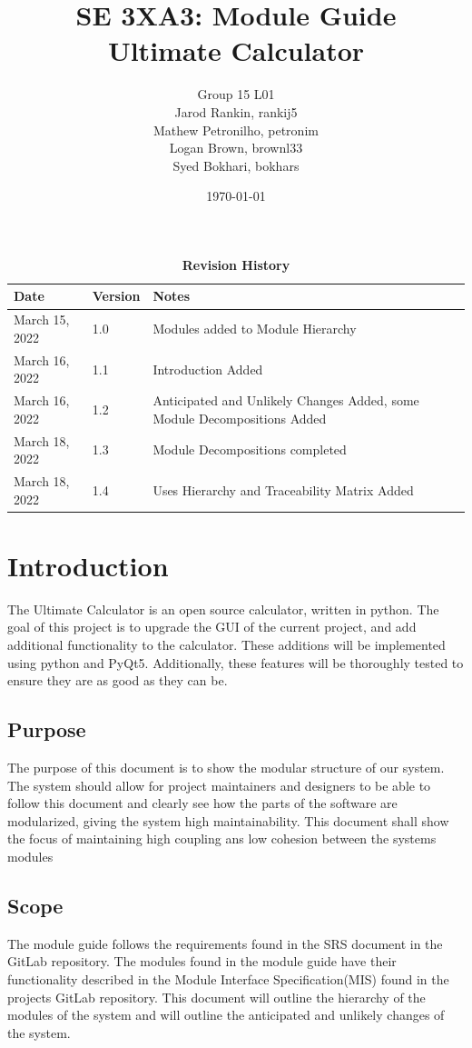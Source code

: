 \documentclass[12pt, titlepage]{article}
\title{SE 3XA3: Module Guide\\Ultimate Calculator}
\author{Group 15 L01
		\\ Jarod Rankin, rankij5
		\\ Mathew Petronilho, petronim
		\\ Logan Brown, brownl33
		\\ Syed Bokhari, bokhars
}
\date{\today}
\begin{document}
\maketitle

\tableofcontents
\listoftables
\listoffigures

\begin{table}[H]
\caption{\bf Revision History}
\begin{tabularx}{\textwidth}{p{3cm}p{2cm}X}
\toprule {\bf Date} & {\bf Version} & {\bf Notes}\\
\midrule
March 15, 2022 & 1.0 & Modules added to Module Hierarchy\\
March 16, 2022 & 1.1 & Introduction Added\\
March 16, 2022 & 1.2 & Anticipated and Unlikely Changes Added, some Module Decompositions Added\\
March 18, 2022 & 1.3 & Module Decompositions completed\\
March 18, 2022 & 1.4 & Uses Hierarchy and Traceability Matrix Added\\
\bottomrule
\end{tabularx}
\end{table}

\newpage


\section{Introduction}
The Ultimate Calculator is an open source calculator, written in python. The goal of this project is to upgrade the GUI of the current project, and add additional functionality to the calculator. These additions will be implemented using python and PyQt5. Additionally, these features will be thoroughly tested to ensure they are as good as they can be.
\subsection{Purpose}
The purpose of this document is to show the modular structure of our system. The system should allow for project maintainers and designers to be able to follow this document and clearly see how the parts of the software are modularized, giving the system high maintainability. This document shall show the focus of maintaining high coupling ans low cohesion between the systems modules
\subsection{Scope}
The module guide follows the requirements found in the SRS document in the GitLab repository. The modules found in the module guide have their functionality described in the Module Interface Specification(MIS) found in the projects GitLab repository. This document will outline the hierarchy of the modules of the system and will outline the anticipated and unlikely changes of the system.
\end{document}
